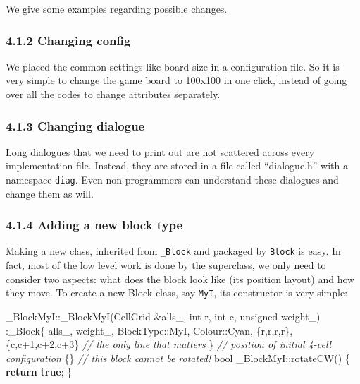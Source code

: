 \documentclass[
]{article}
\newenvironment{Shaded}{}{}
\newcommand{\CommentTok}[1]{\textcolor[rgb]{0.38,0.63,0.69}{\textit{#1}}}
\newcommand{\ControlFlowTok}[1]{\textcolor[rgb]{0.00,0.44,0.13}{\textbf{#1}}}
\newcommand{\DataTypeTok}[1]{\textcolor[rgb]{0.56,0.13,0.00}{#1}}
\newcommand{\DecValTok}[1]{\textcolor[rgb]{0.25,0.63,0.44}{#1}}
\newcommand{\KeywordTok}[1]{\textcolor[rgb]{0.00,0.44,0.13}{\textbf{#1}}}
\newcommand{\NormalTok}[1]{#1}
\newcommand{\VariableTok}[1]{\textcolor[rgb]{0.10,0.09,0.49}{#1}}
\begin{document}
We give some examples regarding possible changes.

\hypertarget{changing-config}{%
\subsubsection{4.1.2 Changing config}\label{changing-config}}

We placed the common settings like board size in a configuration file.
So it is very simple to change the game board to 100x100 in one click,
instead of going over all the codes to change attributes separately.

\hypertarget{changing-dialogue}{%
\subsubsection{4.1.3 Changing dialogue}\label{changing-dialogue}}

Long dialogues that we need to print out are not scattered across every
implementation file. Instead, they are stored in a file called
``dialogue.h'' with a namespace \texttt{diag}. Even non-programmers can
understand these dialogues and change them as will.

\hypertarget{adding-a-new-block-type}{%
\subsubsection{4.1.4 Adding a new block
type}\label{adding-a-new-block-type}}

Making a new class, inherited from \texttt{\_Block} and packaged by
\texttt{Block} is easy. In fact, most of the low level work is done by
the superclass, we only need to consider two aspects: what does the
block look like (its position layout) and how they move. To create a new
Block class, say \texttt{MyI}, its constructor is very simple:

\begin{Shaded}
\begin{Highlighting}[]
\NormalTok{_BlockMyI::_BlockMyI(CellGrid &}\VariableTok{alls_}\NormalTok{,}
                \DataTypeTok{int}\NormalTok{ r, }\DataTypeTok{int}\NormalTok{ c,}
                \DataTypeTok{unsigned} \VariableTok{weight_}\NormalTok{)}
\NormalTok{    :_Block\{}
        \VariableTok{alls_}\NormalTok{, }\VariableTok{weight_}\NormalTok{, BlockType::MyI, Colour::Cyan,}
\NormalTok{        \{r,r,r,r\}, \{c,c+}\DecValTok{1}\NormalTok{,c+}\DecValTok{2}\NormalTok{,c+}\DecValTok{3}\NormalTok{\} }\CommentTok{// the only line that matters}
\NormalTok{    \} }\CommentTok{// position of initial 4-cell configuration}
\NormalTok{\{\}}
\CommentTok{// this block cannot be rotated!}
\DataTypeTok{bool}\NormalTok{ _BlockMyI::rotateCW() \{}
    \ControlFlowTok{return} \KeywordTok{true}\NormalTok{;}
\NormalTok{\}}
\end{Highlighting}
\end{Shaded}
\end{document}
